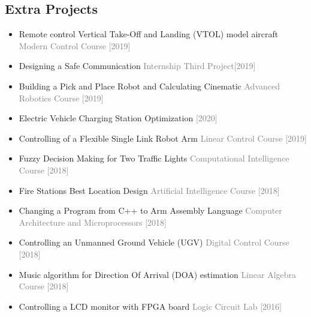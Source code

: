 \documentclass[10pt,a4paper,sans]{moderncv} %
\begin{document}
		\subsection{Extra Projects}
		\begin{itemize}
		\item Remote control Vertical Take-Off and Landing (VTOL) model aircraft \hfill \textcolor{gray}{Modern Control Course [2019]}
		\item Designing a Safe Communication \hfill \textcolor{gray}{Internship Third Project[2019]}	
		\item Building a Pick and Place Robot and Calculating Cinematic \hfill \textcolor{gray}{Advanced Robotics Course [2019]}	
        \item Electric Vehicle Charging Station Optimization \hfill \textcolor{gray}{ [2020]}

		\item Controlling of a Flexible Single Link Robot Arm \hfill \textcolor{gray}{Linear Control Course [2019]}
		
		\item Fuzzy Decision Making for Two Traffic Lights \hfill \textcolor{gray}{Computational Intelligence Course [2018]}
		
		\item Fire Stations Best Location Design \hfill \textcolor{gray}{Artificial Intelligence Course [2018]}	
		
		\item Changing a Program from C++ to Arm Assembly Language \hfill \textcolor{gray}{Computer Architecture and Microprocessors [2018]}
		
		\item Controlling an Unmanned Ground Vehicle (UGV) \hfill \textcolor{gray}{Digital Control Course [2018]}
		
		\item Music algorithm for Direction Of Arrival (DOA) estimation  \hfill \textcolor{gray}{Linear Algebra Course [2018]}
		
		\item Controlling a LCD monitor with FPGA board \hfill \textcolor{gray}{Logic Circuit Lab [2016]}
	\end{itemize}
	
	\vspace{-0.5 em}

\end{document}
